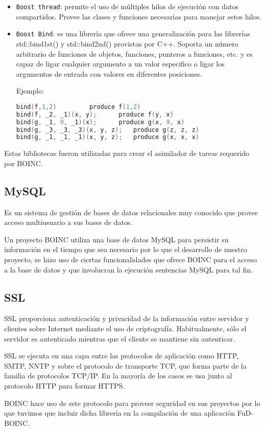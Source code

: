 \begin{itemize}
\item \texttt{Boost thread}: permite el uso de múltiples hilos de ejecución con datos compartidos. Provee las clases y funciones necesarias para manejar estos hilos. 
\item \texttt{Boost Bind}: es una librería que ofrece una generalización para las librerías std::bind1st() y std::bind2nd() provistas por C++. Soporta un número arbitrario de funciones de objetos, funciones, punteros a funciones, etc. y es capaz de ligar cualquier argumento a un valor especifico o ligar los argumentos de entrada con valores en diferentes posiciones.

Ejemplo:

\begin{lstlisting}[frame=shadowbox, language=c++, xleftmargin=8mm, framexleftmargin=20pt, basicstyle=\footnotesize, numberstyle=\footnotesize, backgroundcolor=\color{gris}]
bind(f,1,2)			produce f(1,2)
bind(f, _2, _1)(x, y);		produce f(y, x)
bind(g, _1, 9, _1)(x);		produce g(x, 9, x)
bind(g, _3, _3, _3)(x, y, z);	produce g(z, z, z)
bind(g, _1, _1, _1)(x, y, z);	produce g(x, x, x)
\end{lstlisting}
\end{itemize}

Estas bibliotecas fueron utilizadas para crear el asimilador de tareas requerido por BOINC.

\subsection{MySQL}

Es un sistema de gestión de bases de datos relacionales muy conocido que provee acceso multiusuario a sus bases de datos.

Un proyecto BOINC utiliza una base de datos MySQL para persistir su información en el tiempo que sea necesario por lo que el desarrollo de nuestro proyecto, se hizo uso de ciertas funcionalidades que ofrece BOINC para el acceso a la base de datos y que involucran la ejecución sentencias MySQL para tal fin.

\subsection{SSL}

SSL proporciona autenticación y privacidad de la información entre servidor y clientes sobre Internet mediante el uso de criptografía. Habitualmente, sólo el servidor es autenticado mientras que el cliente se mantiene sin autenticar.

SSL se ejecuta en una capa entre los protocolos de aplicación como HTTP, SMTP, NNTP y sobre el protocolo de transporte TCP, que forma parte de la familia de protocolos TCP/IP. En la mayoría de los casos se usa junto al protocolo HTTP para formar HTTPS. 

BOINC hace uso de este protocolo para proveer seguridad en sus proyectos por lo que tuvimos que incluir dicha librería en la compilación de una aplicación FuD-BOINC.
